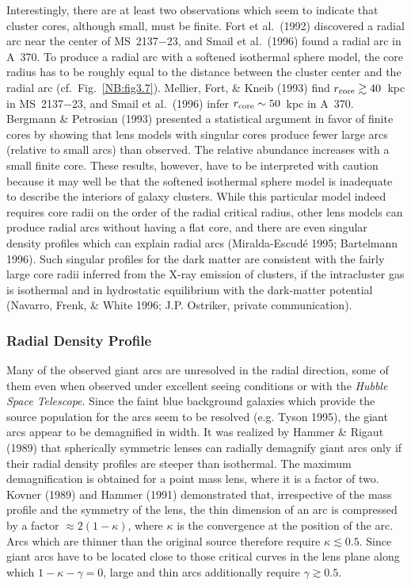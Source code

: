 \documentclass[a4paper,10pt]{article} %
\newcommand{\la}{\lesssim}
\newcommand{\ga}{\gtrsim}
\begin{document}
Interestingly, there are at least two observations which seem to
indicate that cluster cores, although small, must be finite. Fort et
al.\ (1992) discovered a radial arc near the center of MS~2137$-$23,
and Smail et al.\ (1996) found a radial arc in A~370. To produce a
radial arc with a softened isothermal sphere model, the core radius
has to be roughly equal to the distance between the cluster center and
the radial arc (cf.\ Fig.\ \ref{NB:fig3.7}). Mellier, Fort, \& Kneib
(1993) find $r_{\rm core}\ga40$~kpc in MS~2137$-$23, and Smail et al.\
(1996) infer $r_{\rm core}\sim50$~kpc in A~370. Bergmann \& Petrosian
(1993) presented a statistical argument in favor of finite cores by
showing that lens models with singular cores produce fewer large arcs
(relative to small arcs) than observed. The relative abundance
increases with a small finite core. These results, however, have to be
interpreted with caution because it may well be that the softened
isothermal sphere model is inadequate to describe the interiors of
galaxy clusters. While this particular model indeed requires core
radii on the order of the radial critical radius, other lens models
can produce radial arcs without having a flat core, and there are even
singular density profiles which can explain radial arcs
(Miralda-Escud\'e 1995; Bartelmann 1996). Such singular profiles for
the dark matter are consistent with the fairly large core radii
inferred from the X-ray emission of clusters, if the intracluster gas
is isothermal and in hydrostatic equilibrium with the dark-matter
potential (Navarro, Frenk, \& White 1996; J.P. Ostriker, private
communication).

\subsubsection{Radial Density Profile}
\label{NB:subsubsect4.1.5}

Many of the observed giant arcs are unresolved in the radial
direction, some of them even when observed under excellent seeing
conditions or with the {\em Hubble Space Telescope\/}. Since the faint
blue background galaxies which provide the source population for the
arcs seem to be resolved (e.g. Tyson 1995), the giant arcs appear to
be demagnified in width. It was realized by Hammer \& Rigaut (1989)
that spherically symmetric lenses can radially demagnify giant arcs
only if their radial density profiles are steeper than isothermal. The
maximum demagnification is obtained for a point mass lens, where it is
a factor of two. Kovner (1989) and Hammer (1991) demonstrated that,
irrespective of the mass profile and the symmetry of the lens, the
thin dimension of an arc is compressed by a factor
$\approx2(1-\kappa)$, where $\kappa$ is the convergence at the
position of the arc. Arcs which are thinner than the original source
therefore require $\kappa\la0.5$. Since giant arcs have to be located
close to those critical curves in the lens plane along which
$1-\kappa-\gamma=0$, large and thin arcs additionally require
$\gamma\ga0.5$.
\end{document}
